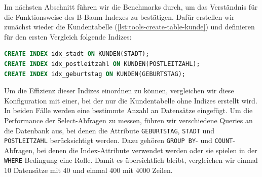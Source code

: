 Im nächsten Abschnitt führen wir die Benchmarks durch, um das Verständnis für die Funktionsweise des B-Baum-Indexes zu bestätigen.
Dafür erstellen wir zunächst wieder die Kundentabelle (\ref{lst:tools-create-table-kunde}) und definieren für den ersten Vergleich folgende Indizes:

\vspace{-5pt}
\begin{lstlisting}[language=SQL,caption=Definition mehrere Indizes,label={lst:indexing-create-multiple}]
CREATE INDEX idx_stadt ON KUNDEN(STADT);
CREATE INDEX idx_postleitzahl ON KUNDEN(POSTLEITZAHL);
CREATE INDEX idx_geburtstag ON KUNDEN(GEBURTSTAG);
\end{lstlisting}
\vspace{-5pt}

Um die Effizienz dieser Indizes einordnen zu können, vergleichen wir diese Konfiguration mit einer, bei der nur die Kundentabelle ohne Indizes erstellt wird.
In beiden Fälle werden eine bestimmte Anzahl an Datensätze eingefügt.
Um die Performance der Select-Abfragen zu messen, führen wir verschiedene Queries an die Datenbank aus, bei denen die Attribute \texttt{GEBURTSTAG}, \texttt{STADT} und \texttt{POSTLEITZAHL} berücksichtigt werden.
Dazu gehören \texttt{GROUP BY}- und \texttt{COUNT}-Abfragen, bei denen die Index-Attribute verwendet werden oder sie spielen in der \texttt{WHERE}-Bedingung eine Rolle.
Damit es übersichtlich bleibt, vergleichen wir einmal 10 Datensätze mit 40 und einmal 400 mit 4000 Zeilen.

